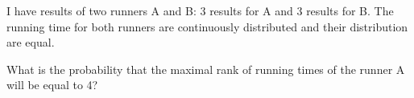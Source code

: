
\begin{question}
I have results of two runners A and B: 3 results for A and 3 results
for B. The running time for both runners are continuously distributed and their distribution are equal.

What is the probability that the maximal rank of running times of the runner A will be equal to 4?
\end{question}


